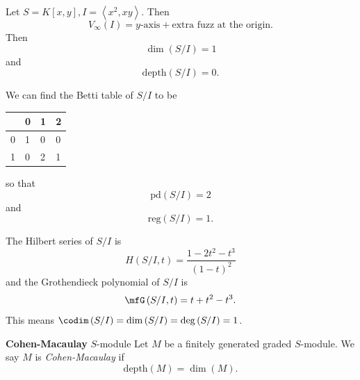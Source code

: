 \documentclass[co439]{subfiles}
\begin{document}
    \begin{example}{}
        Let $S=K\left[ x,y \right], I = \left< x^{2},xy \right>$. Then
        \begin{equation*}
            V_{\infty}\left( I \right) = \text{$y$-axis}+\text{extra fuzz at the origin}.
        \end{equation*}
        Then
        \begin{equation*}
            \dim\left( S /I\right) = 1
        \end{equation*}
        and
        \begin{equation*}
            \text{depth}\left( S /I \right) = 0.
        \end{equation*}
        
        We can find the Betti table of $S /I$ to be

        \noindent
        \begin{tabularx}{\textwidth}{|X|X|X|X|}
            \hline
              & 0 & 1 & 2 \\
            \hline
            0 & 1 & 0 & 0 \\
            1 & 0 & 2 & 1 \\
            \hline
        \end{tabularx}
        so that
        \begin{equation*}
            \text{pd}\left( S /I \right) = 2
        \end{equation*}
        and
        \begin{equation*}
            \text{reg}\left( S /I \right) = 1.
        \end{equation*}

        The Hilbert series of $S /I$ is
        \begin{equation*}
            H\left( S /I, t \right) = \frac{1-2t^2-t^{3}}{\left( 1-t \right)^2}
        \end{equation*}
        and the Grothendieck polynomial of $S /I$ is
        \begin{equation*}
            \mfG\left( S /I,t \right) = t+t^{2}-t^{3}.
        \end{equation*}
        This means $\codim\left( S /I \right) = \dim\left( S /I \right) = \deg\left( S /I \right) = 1$.
    \end{example}

    \rruleline

    \begin{definition}{\textbf{Cohen-Macaulay} $S$-module}
        Let $M$ be a finitely generated graded $S$-module. We say $M$ is \emph{Cohen-Macaulay} if
        \begin{equation*}
            \text{depth}\left( M \right) = \dim\left( M \right).
        \end{equation*}
    \end{definition}
    
\end{document}
